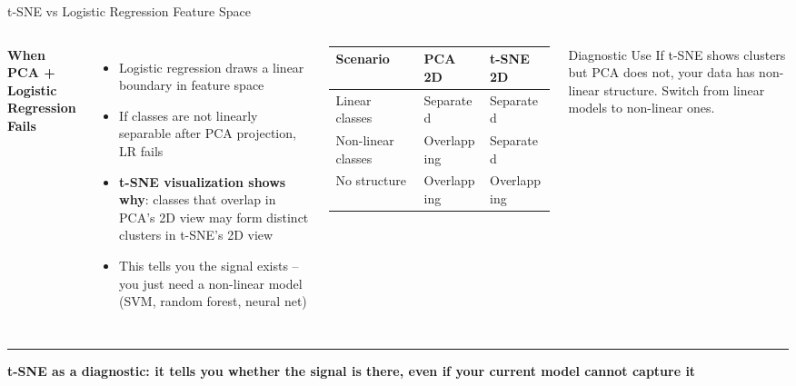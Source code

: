 \documentclass[8pt,aspectratio=169]{beamer}
\newcommand{\bottomnote}[1]{%
\vfill
\vspace{-2mm}
\textcolor{mllavender2}{\rule{\textwidth}{0.4pt}}
\vspace{1mm}
\footnotesize
\textbf{#1}
}
\newenvironment{compactlist}{%
  \begin{itemize}%
    \setlength{\itemsep}{2pt}%
    \setlength{\parskip}{0pt}%
    \setlength{\parsep}{0pt}%
}{%
  \end{itemize}%
}
\newcommand{\highlight}[1]{\textcolor{mlorange}{\textbf{#1}}}
\begin{document}
\begin{frame}[t]{t-SNE vs Logistic Regression Feature Space}
\begin{columns}[T]
\small
\textbf{When PCA + Logistic Regression Fails}

\vspace{2mm}
\begin{compactlist}
\item Logistic regression draws a linear boundary in feature space
\item If classes are not linearly separable after PCA projection, LR fails
\item \highlight{t-SNE visualization shows why}: classes that overlap in PCA's 2D view may form distinct clusters in t-SNE's 2D view
\item This tells you the signal exists -- you just need a non-linear model (SVM, random forest, neural net)
\end{compactlist}

\vspace{2mm}
\footnotesize
\begin{tabular}{@{}l l l@{}}
\toprule
\textbf{Scenario} & \textbf{PCA 2D} & \textbf{t-SNE 2D} \\
\midrule
\rowcolor{mllavender4}
Linear classes & Separated & Separated \\
Non-linear classes & Overlapping & Separated \\
\rowcolor{mllavender4}
No structure & Overlapping & Overlapping \\
\bottomrule
\end{tabular}

\begin{block}{Diagnostic Use}
\scriptsize If t-SNE shows clusters but PCA does not, your data has non-linear structure. Switch from linear models to non-linear ones.
\end{block}
\end{columns}

\bottomnote{t-SNE as a diagnostic: it tells you whether the signal is there, even if your current model cannot capture it}
\end{frame}
\end{document}
